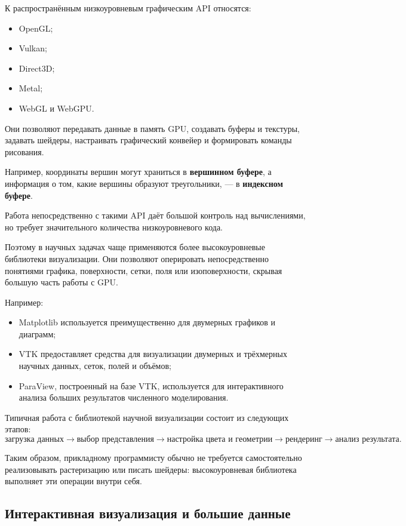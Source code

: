 К распространённым низкоуровневым графическим API относятся:
\begin{itemize}
	\item OpenGL;
	\item Vulkan;
	\item Direct3D;
	\item Metal;
	\item WebGL и WebGPU.
\end{itemize}

Они позволяют передавать данные в память GPU, создавать буферы и текстуры, задавать шейдеры, настраивать графический конвейер и формировать команды рисования.

Например, координаты вершин могут храниться в \textbf{вершинном буфере}, а информация о том, какие вершины образуют треугольники, --- в \textbf{индексном буфере}.

Работа непосредственно с такими API даёт большой контроль над вычислениями, но требует значительного количества низкоуровневого кода.

Поэтому в научных задачах чаще применяются более высокоуровневые библиотеки визуализации. Они позволяют оперировать непосредственно понятиями графика, поверхности, сетки, поля или изоповерхности, скрывая большую часть работы с GPU.

Например:
\begin{itemize}
	\item Matplotlib используется преимущественно для двумерных графиков и диаграмм;
	\item VTK предоставляет средства для визуализации двумерных и трёхмерных научных данных, сеток, полей и объёмов;
	\item ParaView, построенный на базе VTK, используется для интерактивного анализа больших результатов численного моделирования.
\end{itemize}

Типичная работа с библиотекой научной визуализации состоит из следующих этапов:
\[
\text{загрузка данных}
\rightarrow
\text{выбор представления}
\rightarrow
\text{настройка цвета и геометрии}
\rightarrow
\text{рендеринг}
\rightarrow
\text{анализ результата}.
\]

Таким образом, прикладному программисту обычно не требуется самостоятельно реализовывать растеризацию или писать шейдеры: высокоуровневая библиотека выполняет эти операции внутри себя.

\subsection{Интерактивная визуализация и большие данные}


